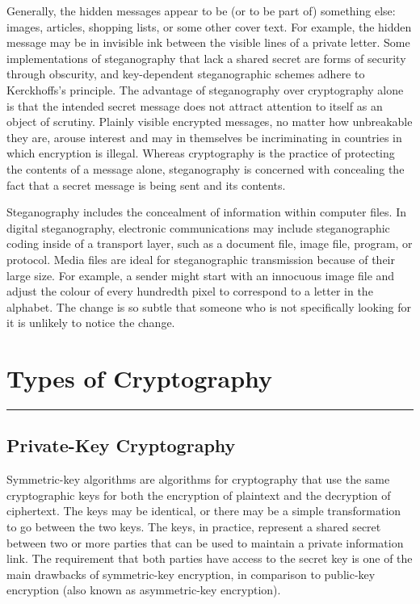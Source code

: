 \documentclass[british]{article}
\begin{document}
Generally, the hidden messages appear to be (or to be part of) something
else: images, articles, shopping lists, or some other cover text.
For example, the hidden message may be in invisible ink between the
visible lines of a private letter. Some implementations of steganography
that lack a shared secret are forms of security through obscurity,
and key-dependent steganographic schemes adhere to Kerckhoffs's principle.
The advantage of steganography over cryptography alone is that the
intended secret message does not attract attention to itself as an
object of scrutiny. Plainly visible encrypted messages, no matter
how unbreakable they are, arouse interest and may in themselves be
incriminating in countries in which encryption is illegal. Whereas
cryptography is the practice of protecting the contents of a message
alone, steganography is concerned with concealing the fact that a
secret message is being sent and its contents.

Steganography includes the concealment of information within computer
files. In digital steganography, electronic communications may include
steganographic coding inside of a transport layer, such as a document
file, image file, program, or protocol. Media files are ideal for
steganographic transmission because of their large size. For example,
a sender might start with an innocuous image file and adjust the colour
of every hundredth pixel to correspond to a letter in the alphabet.
The change is so subtle that someone who is not specifically looking
for it is unlikely to notice the change.

\vfill{}

\pagebreak{}

\section{Types of Cryptography}
\begin{center}
\rule[0.5ex]{450bp}{0.75pt}
\par\end{center}

\subsection{Private-Key Cryptography}

Symmetric-key algorithms are algorithms for cryptography that use
the same cryptographic keys for both the encryption of plaintext and
the decryption of ciphertext. The keys may be identical, or there
may be a simple transformation to go between the two keys. The keys,
in practice, represent a shared secret between two or more parties
that can be used to maintain a private information link. The requirement
that both parties have access to the secret key is one of the main
drawbacks of symmetric-key encryption, in comparison to public-key
encryption (also known as asymmetric-key encryption). 
\end{document}
